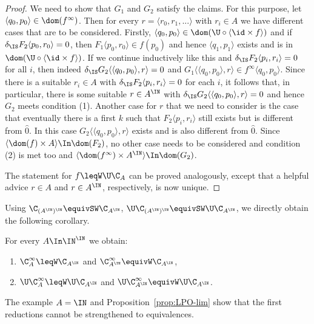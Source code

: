 \documentclass{lmcs}
\begin{document}
\begin{proof}
\noindent
We need to show that $G_1$ and $G_2$ satisfy the claims. For this purpose, let $\langle q_0,p_0\rangle\in\dom(f^\infty)$.
Then for every $r=\langle r_0,r_1,...\rangle$ with $r_i\in A$  we have different cases that are to be considered.
Firstly, $\langle q_0,p_0\rangle\in\dom(\U\circ\langle\id\times f\rangle)$ and if $\delta_\IS F_2\langle p_0,r_0\rangle=0$, then $F_1\langle p_0,r_0\rangle\in f(p_0)$ and
hence $\langle q_1,p_1\rangle$ exists and is in $\dom(\U\circ\langle\id\times f\rangle)$. If we continue inductively like this and $\delta_\IS F_2\langle p_i,r_i\rangle=0$
for all $i$, then indeed $\delta_\IS G_2\langle\langle q_0,p_0\rangle,r\rangle=0$ and
$G_1\langle\langle q_0,p_0\rangle,r\rangle\in f^\infty\langle q_0,p_0\rangle$.
Since there is a suitable $r_i\in A$ with $\delta_\IS F_2\langle p_i,r_i\rangle=0$ for each $i$, it follows that,
in particular, there is some suitable $r\in A^\IN$ with $\delta_\IS G_2\langle\langle q_0,p_0\rangle,r\rangle=0$
and hence $G_2$ meets condition (1). Another case for $r$ that we need to consider is the case that
eventually there is a first $k$ such that $F_2\langle p_i,r_i\rangle$ still exists but is different from $\widehat{0}$.
In this case $G_2\langle\langle q_0,p_0\rangle,r\rangle$ exists and is also different from $\widehat{0}$.
Since $\langle \dom(f)\times A\rangle\In\dom(F_2)$, no other case needs to be considered and condition (2)
is met too and $\langle \dom(f^\infty)\times A^\IN\rangle\In\dom(G_2)$.

The statement for $f\leqW\U\C_A$ can be proved analogously, except that a helpful advice 
$r\in A$ and $r\in A^\IN$, respectively, is now unique.
\end{proof}

\noindent
Using $\C_{(A^\IN)^\IN}\equivSW\C_{A^\IN}$, $\U\C_{(A^\IN)^\IN}\equivSW\U\C_{A^\IN}$, 
we directly obtain the following corollary.

\begin{cor}
For every $A\In\IN^\IN$ we obtain:
\begin{enumerate}
\item $\C_A^\infty\leqW\C_{A^\IN}$ and $\C_{A^\IN}^\infty\equivW\C_{A^\IN}$,
\item $\U\C_A^\infty\leqW\U\C_{A^\IN}$ and $\U\C_{A^\IN}^\infty\equivW\U\C_{A^\IN}$.
\end{enumerate}
\end{cor}

\noindent
The example $A=\IN$ and Proposition~\ref{prop:LPO-lim} show that the first reductions cannot be strengthened to equivalences.
\end{document}
